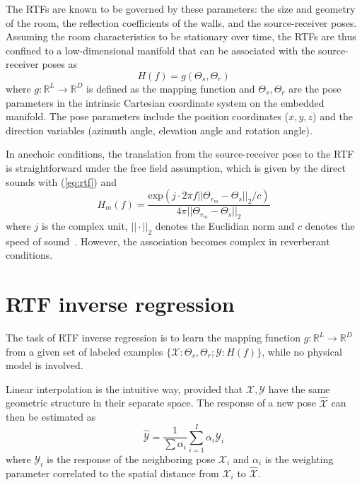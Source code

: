 \documentclass[journal]{IEEEtran}
\begin{document}
The RTFs are known to be governed by these parameters: the size and geometry of the room, the reflection coefficients of the walls, and the source-receiver poses. Assuming the room characteristics to be stationary over time, the RTFs are thus confined to a low-dimensional manifold that can be associated with the source-receiver poses as
\begin{equation}\label{eq:rtfpose}
    H(f) = g(\Theta_s,\Theta_r)
\end{equation}
where $g:\mathbb{R}^{L}\rightarrow \mathbb{R}^{D}$ is defined as the mapping function and $\Theta_s,\Theta_r$ are the pose parameters in the intrinsic Cartesian coordinate system on the embedded manifold. The pose parameters include the position coordinates ($x, y, z$) and the direction variables (azimuth angle, elevation angle and rotation angle).

In anechoic conditions, the translation from the source-receiver pose to the RTF is straightforward under the free field assumption, which is given by the direct sounds with (\ref{eq:rtf}) and
\begin{equation}\label{eq:green}
  H_m(f)=\frac{\text{exp}(j\cdot 2\pi f ||\Theta_{r_m} - \Theta_s||_2 / c)}{4\pi ||\Theta_{r_m} - \Theta_s||_2}
\end{equation}
where $j$ is the complex unit, $||\cdot||_2$ denotes the Euclidian norm and $c$ denotes the speed of sound~\cite{samarasinghe2015efficient}. However, the association becomes complex in reverberant conditions.

\section{RTF inverse regression}

The task of RTF inverse regression is to learn the mapping function $g:\mathbb{R}^{L}\rightarrow \mathbb{R}^{D}$ from a given set of labeled examples $\{\mathcal{X}:\Theta_s,\Theta_r; \mathcal{Y}:H(f)\}$, while no physical model is involved.

Linear interpolation is the intuitive way, provided that $\mathcal{X},\mathcal{Y}$ have the same geometric structure in their separate space. The response of a new pose $\widehat{\mathcal{X}}$ can then be estimated as
\begin{equation}\label{eq:linearinter}
  \widehat{\mathcal{Y}}=\frac{1}{\sum \alpha_i}\sum_{i=1}^{I}\alpha_i \mathcal{Y}_i
\end{equation}
where $\mathcal{Y}_i$ is the response of the neighboring pose $\mathcal{X}_i$ and $\alpha_i$ is the weighting parameter correlated to the spatial distance from $\mathcal{X}_i$ to $\widehat{\mathcal{X}}$.
\end{document}
